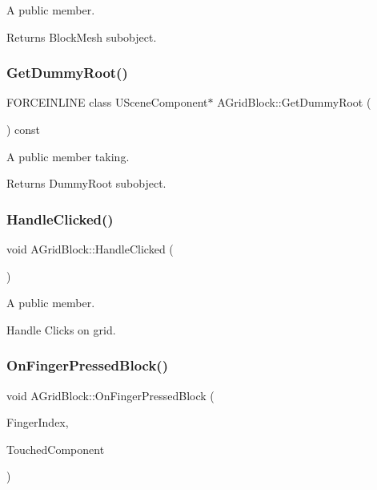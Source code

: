 A public member. 

Returns Block\+Mesh subobject. \hypertarget{class_a_grid_block_a666f4929d04306cbe30f437d8f9f94a4}{}\label{class_a_grid_block_a666f4929d04306cbe30f437d8f9f94a4} 
\subsubsection{\texorpdfstring{Get\+Dummy\+Root()}{GetDummyRoot()}}
{\footnotesize\ttfamily F\+O\+R\+C\+E\+I\+N\+L\+I\+NE class U\+Scene\+Component$\ast$ A\+Grid\+Block\+::\+Get\+Dummy\+Root (\begin{DoxyParamCaption}{ }\end{DoxyParamCaption}) const\hspace{0.3cm}{\ttfamily [inline]}}



A public member taking. 

Returns Dummy\+Root subobject. \hypertarget{class_a_grid_block_aab961b92795d28c156b9a64bf4936e36}{}\label{class_a_grid_block_aab961b92795d28c156b9a64bf4936e36} 
\subsubsection{\texorpdfstring{Handle\+Clicked()}{HandleClicked()}}
{\footnotesize\ttfamily void A\+Grid\+Block\+::\+Handle\+Clicked (\begin{DoxyParamCaption}{ }\end{DoxyParamCaption})}



A public member. 

Handle Clicks on grid. \hypertarget{class_a_grid_block_adb85baf2109b5a97d951b999b2890524}{}\label{class_a_grid_block_adb85baf2109b5a97d951b999b2890524} 
\subsubsection{\texorpdfstring{On\+Finger\+Pressed\+Block()}{OnFingerPressedBlock()}}
{\footnotesize\ttfamily void A\+Grid\+Block\+::\+On\+Finger\+Pressed\+Block (\begin{DoxyParamCaption}\item[{E\+Touch\+Index\+::\+Type}]{Finger\+Index,  }\item[{U\+Primitive\+Component $\ast$}]{Touched\+Component }\end{DoxyParamCaption})}



